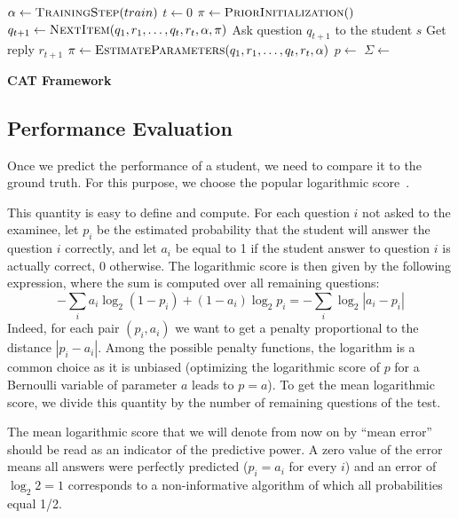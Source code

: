 \documentclass{edm_template}
\begin{document}
\begin{algorithm}
\begin{algorithmic}
\State $\alpha \gets \Call{TrainingStep}{train}$
\State $t \gets 0$
	\State $\pi \gets \Call{PriorInitialization}$
		\State $q_{t + 1} \gets \Call{NextItem}{q_1, r_1, \ldots, q_t, r_t, \alpha, \pi}$
		\State Ask question $q_{t + 1}$ to the student $s$
		\State Get reply $r_{t + 1}$
		\State $\pi \gets \Call{EstimateParameters}{q_1, r_1, \ldots, q_t, r_t, \alpha}$
		\State $p \gets$ 
		\State $\Sigma \gets$ 
	\EndWhile
\EndFor
\EndProcedure
\end{algorithmic}
\caption{\textbf{CAT Framework}}
\label{algo}
\end{algorithm}

\subsection{Performance Evaluation}

Once we predict the performance of a student, we need to compare it to the ground truth. For this purpose, we choose the popular logarithmic score~\cite{Gneiting2007}. 

This quantity is easy to define and compute. For each question $i$ not asked to the examinee, let $p_i$ be the estimated probability that the student will answer the question $i$ correctly, and let $a_i$ be equal to 1 if the student answer to question $i$ is actually correct, 0 otherwise. The logarithmic score is then given by the following expression, where the sum is computed over all remaining questions: 
\[ - \sum_i a_i \log_2 (1 - p_i) + (1-a_i) \log_2 p_i = - \sum_i \log_2 | a_i - p_i | \]
Indeed, for each pair $(p_i, a_i)$ we want to get a penalty proportional to the distance $|p_i - a_i|$. Among the possible penalty functions, the logarithm is a common choice as it is unbiased (optimizing the logarithmic score of $p$ for a Bernoulli variable of parameter $a$ leads to $p=a$). To get the mean logarithmic score, we divide this quantity by the number of remaining questions of the test.

The mean logarithmic score that we will denote from now on by ``mean error'' should be read as an indicator of the predictive power. A zero value of the error means all answers were perfectly predicted ($p_i = a_i$ for every $i$) and an error of $\log_2 2 = 1$ corresponds to a non-informative algorithm of which all probabilities equal 1/2. 
\end{document}
